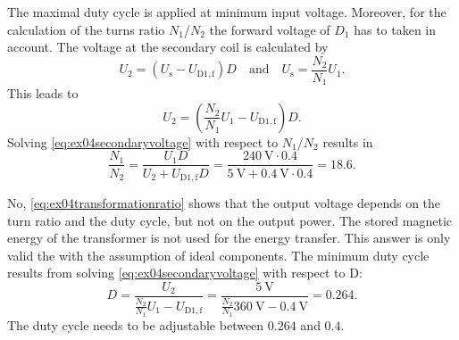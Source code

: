 \begin{solutionblock}
    The maximal duty cycle is applied at minimum input voltage. Moreover, for the calculation of the 
    turns ratio $N_\mathrm{1}$/$N_\mathrm{2}$ the forward voltage of $D_\mathrm{1}$ has to taken in account.
    The voltage at the secondary coil is calculated by
    \begin{equation}
        U_\mathrm{2}=\left(U_\mathrm{s}-U_\mathrm{D1,f}\right) D \quad  \mbox{and} \quad 
        U_\mathrm{s}=\frac{N_\mathrm{2}}{N_\mathrm{1}}U_\mathrm{1}.
        \label{eq:ex04transformationratio}        
    \end{equation}
    This leads to
    \begin{equation}
        U_\mathrm{2}=\left(\frac{N_\mathrm{2}}{N_\mathrm{1}}U_\mathrm{1}-U_\mathrm{D1,f}\right) D.
        \label{eq:ex04secondaryvoltage}  
    \end{equation}
    Solving \eqref{eq:ex04secondaryvoltage} with respect to $N_\mathrm{1}$/$N_\mathrm{2}$ results in
    \begin{equation}
        \frac{N_\mathrm{1}}{N_\mathrm{2}}=\frac{U_\mathrm{1}D}{U_\mathrm{2}+ U_\mathrm{D1,f}D}
        =\frac{\SI{240}{\volt}\cdot 0.4}{\SI{5}{\volt}+\SI{0.4}{\volt} \cdot 0.4 }=18.6.
    \end{equation}
\end{solutionblock}



\begin{solutionblock}
    No, \eqref{eq:ex04transformationratio} shows that the output voltage depends on the turn ratio and the duty cycle,
    but not on the output power. The stored magnetic energy of the transformer is not used for the energy transfer.
    This answer is only valid the with the assumption of ideal components. 
    The minimum duty cycle results from solving \eqref{eq:ex04secondaryvoltage} with respect to D:
    \begin{equation}
        D=\frac{U_\mathrm{2}}{\frac{N_\mathrm{2}}{N_\mathrm{1}}U_\mathrm{1}-U_\mathrm{D1,f}}=
        \frac{\SI{5}{\volt}}{\frac{N_\mathrm{2}}{N_\mathrm{1}}\SI{360}{\volt}-\SI{0.4}{\volt}}=0.264.
    \end{equation}
    The duty cycle needs to be adjustable between $0.264$ and $0.4$.
\end{solutionblock}
         
